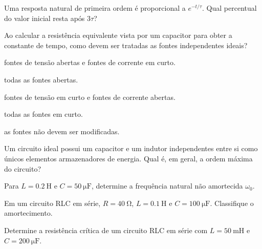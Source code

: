 \begin{questao}[1]{}

Uma resposta natural de primeira ordem é proporcional a $e^{-t/\tau}$. Qual
percentual do valor inicial resta após $3\tau$?


\end{questao}
\begin{questao}[1]{}

Ao calcular a resistência equivalente vista por um capacitor para obter a
constante de tempo, como devem ser tratadas as fontes independentes ideais?
\begin{alternativas}
\item fontes de tensão abertas e fontes de corrente em curto.
\item todas as fontes abertas.
\item fontes de tensão em curto e fontes de corrente abertas.
\item todas as fontes em curto.
\item as fontes não devem ser modificadas.
\end{alternativas}


\end{questao}
\begin{questao}[1]{}

Um circuito ideal possui um capacitor e um indutor independentes entre si como
únicos elementos armazenadores de energia. Qual é, em geral, a ordem máxima do
circuito?


\end{questao}
\begin{questao}[1]{}

Para $L=\SI{0.2}{\henry}$ e $C=\SI{50}{\micro\farad}$, determine a frequência
natural não amortecida $\omega_0$.


\end{questao}
\begin{questao}[1]{}

Em um circuito RLC em série, $R=\SI{40}{\ohm}$, $L=\SI{0.1}{\henry}$ e
$C=\SI{100}{\micro\farad}$. Classifique o amortecimento.


\end{questao}
\begin{questao}[1]{}

Determine a resistência crítica de um circuito RLC em série com $L=\SI{50}{\milli\henry}$ e
$C=\SI{200}{\micro\farad}$.


\end{questao}


